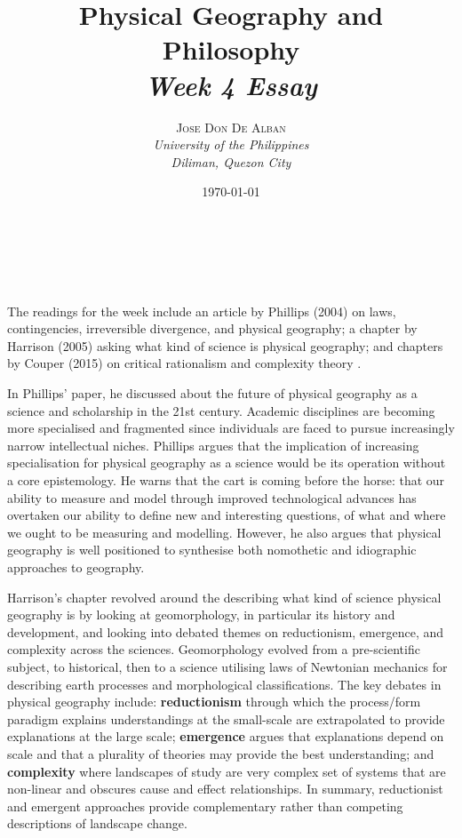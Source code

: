 \documentclass[a4paper, 10.5pt]{article} %
\title{\textbf{Physical Geography and Philosophy}\\ %
\textsl{Week 4 Essay}} %
\author{\textsc{Jose Don De Alban} %
\\{\textit{University of the Philippines} %
\\{\textit{Diliman, Quezon City}}}} %
\date{\today} %
\makeatletter
\renewcommand{\maketitle}
{
\begin{flushright} %
{\LARGE\@title} %
\vspace{40pt} %

{\large\@author} %
\\\@date %

\vspace{10pt} %
\end{flushright}
}
\makeatother
\begin{document}
\maketitle %


\section*{}

The readings for the week include an article by Phillips (2004) \cite{phillips_2004} on laws, contingencies, irreversible divergence, and physical geography; a chapter by Harrison (2005) \cite{harrison_2005} asking what kind of science is physical geography; and chapters by Couper (2015)  on critical rationalism \cite{couper_2015a} and complexity theory \cite{couper_2015b}.

In Phillips' paper, he discussed about the future of physical geography as a science and scholarship in the 21st century. Academic disciplines are becoming more specialised and fragmented since individuals are faced to pursue increasingly narrow intellectual niches. Phillips argues that the implication of increasing specialisation for physical geography as a science would be its operation without a core epistemology. He warns that the cart is coming before the horse: that our ability to measure and model through improved technological advances has overtaken our ability to define new and interesting questions, of what and where we ought to be measuring and modelling. However, he also argues that physical geography is well positioned to synthesise both nomothetic and idiographic approaches to geography.

Harrison's chapter revolved around the describing what kind of science physical geography is by looking at geomorphology, in particular its history and development, and looking into debated themes on reductionism, emergence, and complexity across the sciences. Geomorphology evolved from a pre-scientific subject, to historical, then to a science utilising laws of Newtonian mechanics for describing earth processes and morphological classifications. The key debates in physical geography include: \textbf{reductionism} through which the process/form paradigm explains understandings at the small-scale are extrapolated to provide explanations at the large scale; \textbf{emergence} argues that explanations depend on scale and that a plurality of theories may provide the best understanding; and \textbf{complexity} where landscapes of study are very complex set of systems that are non-linear and obscures cause and effect relationships. In summary, reductionist and emergent approaches provide complementary rather than competing descriptions of landscape change.
\end{document}
